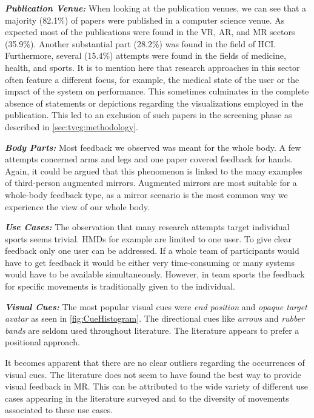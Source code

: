 \textbf{\emph{Publication Venue:}} When looking at the publication venues, we can see that a majority (82.1\%) of papers were published in a computer science venue. As expected most of the publications were found in the VR, AR, and MR sectors (35.9\%). Another substantial part (28.2\%) was found in the field of HCI. Furthermore, several (15.4\%) attempts were found in the fields of medicine, health, and sports. It is to mention here that research approaches in this sector often feature a different focus, for example, the medical state of the user or the impact of the system on performance. This sometimes culminates in the complete absence of statements or depictions regarding the visualizations employed in the publication. This led to an exclusion of such papers in the screening phase as described in \autoref{sec:tvcg:methodology}.

\textbf{\emph{Body Parts:}} Most feedback we observed was meant for the whole body. A few attempts concerned arms and legs and one paper covered feedback for hands. Again, it could be argued that this phenomenon is linked to the many examples of third-person augmented mirrors. Augmented mirrors are most suitable for a whole-body feedback type, as a mirror scenario is the most common way we experience the view of our whole body.

\textbf{\emph{Use Cases:}} The observation that many research attempts target individual sports seems trivial. HMDs for example are limited to one user. To give clear feedback only one user can be addressed. If a whole team of participants would have to get feedback it would be either very time-consuming or many systems would have to be available simultaneously. However, in team sports the feedback for specific movements is traditionally given to the individual.

\textbf{\emph{Visual Cues:}} The most popular visual cues were \emph{end position} and \emph{opaque target avatar} as seen in \autoref{fig:CueHistogram}. The directional cues like \emph{arrows} and \emph{rubber bands} are seldom used throughout literature. The literature appears to prefer a positional approach.

It becomes apparent that there are no clear outliers regarding the occurrences of visual cues. The literature does not seem to have found the best way to provide visual feedback in MR. This can be attributed to the wide variety of different use cases appearing in the literature surveyed and to the diversity of movements associated to these use cases.

